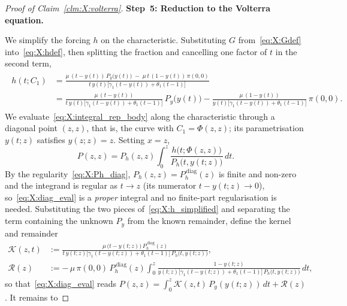 \begin{proof}[Proof of Claim~\ref{clm:X:volterra}]
\medskip\noindent\textbf{Step~5: Reduction to the Volterra equation.}

We simplify the forcing $h$ on the characteristic. Substituting $G$
from~\eqref{eq:X:Gdef} into~\eqref{eq:X:hdef}, then splitting the fraction and
cancelling one factor of $t$ in the second term,
\begin{align}
    \begin{split}
        h(t;C_1)
        &= \frac{\mu\,(t-y(t))\,P_y\!\bigl(y(t)\bigr)
                 \;-\;\mu\,t\,(1-y(t))\,\pi(0,0)}
                {t\,y(t)\bigl[\gamma_1(t-y(t))+\theta_1(t-1)\bigr]} \\[4pt]
        &= \frac{\mu\,(t-y(t))}{t\,y(t)\bigl[\gamma_1(t-y(t))+\theta_1(t-1)\bigr]}\,P_y\!\bigl(y(t)\bigr)
        - \frac{\mu\,(1-y(t))}{y(t)\bigl[\gamma_1(t-y(t))+\theta_1(t-1)\bigr]}\,\pi(0,0).
    \end{split}
    \label{eq:X:h_simplified}
\end{align}
We evaluate~\eqref{eq:X:integral_rep_body} along the characteristic through a diagonal
point $(z,z)$, that is, the curve with $C_1=\Phi(z,z)$; its parametrisation $y(t;z)$
satisfies $y(z;z)=z$. Setting $x=z$,
\begin{equation}
    P(z,z) = P_h(z,z)\int_0^z \frac{h\bigl(t;\Phi(z,z)\bigr)}{P_h\bigl(t,y(t;z)\bigr)}\,dt.
    \label{eq:X:diag_eval}
\end{equation}
By the regularity~\eqref{eq:X:Ph_diag}, $P_h(z,z)=P_h^{\,\mathrm{diag}}(z)$ is finite and
non-zero and the integrand is regular as $t\to z$ (its numerator
$t-y(t;z)\to0$), so~\eqref{eq:X:diag_eval} is a \emph{proper} integral and no
finite-part regularisation is needed. Substituting the two
pieces of~\eqref{eq:X:h_simplified} and separating the term containing the unknown $P_y$
from the known remainder, define the kernel and remainder
\begin{align}
    \mathcal{K}(z,t) &:= \frac{\mu\,\bigl(t-y(t;z)\bigr)\,P_h^{\,\mathrm{diag}}(z)}
        {t\,y(t;z)\bigl[\gamma_1(t-y(t;z))+\theta_1(t-1)\bigr]\,P_h\bigl(t,y(t;z)\bigr)},
    \label{eq:X:kernel}\\[6pt]
    \mathcal{R}(z) &:= -\,\mu\,\pi(0,0)\,P_h^{\,\mathrm{diag}}(z)
        \int_0^z \frac{1-y(t;z)}
        {y(t;z)\bigl[\gamma_1(t-y(t;z))+\theta_1(t-1)\bigr]\,P_h\bigl(t,y(t;z)\bigr)}\,dt,
    \nonumber
\end{align}
so that~\eqref{eq:X:diag_eval} reads
$P(z,z)=\int_0^z\mathcal{K}(z,t)\,P_y(y(t;z))\,dt+\mathcal{R}(z)$. It remains to

\end{proof}

